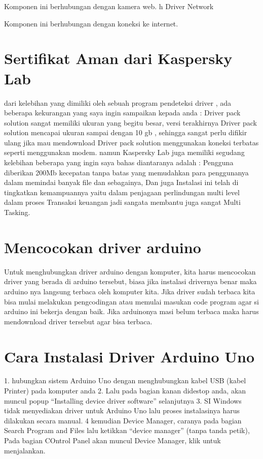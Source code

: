  Komponen ini berhubungan dengan kamera web.
h	Driver Network 

 Komponen ini berhubungan dengan koneksi ke internet.


\section{Sertifikat Aman dari Kaspersky Lab}
dari kelebihan yang dimiliki oleh sebuah program pendeteksi driver , ada beberapa kekurangan yang saya ingin sampaikan kepada anda  :
Driver pack solution sangat memiliki ukuran yang begitu besar,  versi terakhirnya Driver pack solution mencapai ukuran sampai dengan 10 gb , sehingga sangat perlu difikir ulang jika mau  mendownload Driver pack solution menggunakan koneksi terbatas seperti menggunakan modem.
namun Kaspersky Lab juga memiliki segudang kelebihan beberapa yang ingin saya bahas diantaranya adalah :
Pengguna diberikan 200Mb kecepatan tanpa batas yang memudahkan para penggunanya dalam memindai banyak file dan sebagainya, Dan juga Instalasi ini telah di tingkatkan kemampuannya yaitu dalam penjagaan perlindungan multi level dalam proses Transaksi keuangan jadi sangata membantu juga sangat Multi Tasking.

\section{Mencocokan driver arduino}
Untuk menghubungkan driver arduino dengan komputer, kita harus mencocokan driver yang berada di arduino tersebut, biasa jika instalasi drivernya benar maka arduino nya langsung terbaca oleh komputer kita. Jika driver sudah terbaca kita bisa mulai melakukan pengcodingan atau memulai masukan code program agar si arduino ini bekerja dengan baik. Jika arduinonya masi belum terbaca maka harus mendownload driver tersebut agar bisa terbaca.
\section {Cara Instalasi Driver Arduino Uno}

1. hubungkan sistem  Arduino Uno dengan menghubungkan kabel USB (kabel Printer) pada komputer anda
2. Lalu pada bagian kanan didestop anda, akan muncul popup “Installing device driver software” selanjutnya
3. SI Windows tidak menyediakan driver untuk Arduino Uno lalu proses instalasinya harus dilakukan secara manual.
4 kemudian Device Manager, caranya pada bagian Search Program and Files lalu ketikkan “device manager” (tanpa tanda petik), Pada bagian COntrol Panel akan muncul Device Manager, klik untuk menjalankan.
